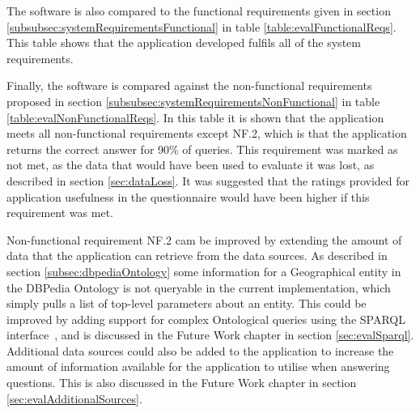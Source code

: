 \documentclass[authoryearcitations]{UoYCSproject}
\begin{document}
The software is also compared to the functional requirements given in section \ref{subsubsec:systemRequirementsFunctional} in table \ref{table:evalFunctionalReqs}. This table shows that the application developed fulfils all of the system requirements.

Finally, the software is compared against the non-functional requirements proposed in section \ref{subsubsec:systemRequirementsNonFunctional} in table \ref{table:evalNonFunctionalReqs}. In this table it is shown that the application meets all non-functional requirements except NF.2, which is that the application returns the correct answer for 90\% of queries. This requirement was marked as not met, as the data that would have been used to evaluate it was lost, as described in section \ref{sec:dataLoss}. It was suggested that the ratings provided for application usefulness in the questionnaire would have been higher if this requirement was met.

Non-functional requirement NF.2 cam be improved by extending the amount of data that the application can retrieve from the data sources. As described in section \ref{subsec:dbpediaOntology} some information for a Geographical entity in the DBPedia Ontology is not queryable in the current implementation, which simply pulls a list of top-level parameters about an entity. This could be improved by adding support for complex Ontological queries using the SPARQL interface~\cite{dbPediaSparql}, and is discussed in the Future Work chapter in section \ref{sec:evalSparql}. Additional data sources could also be added to the application to increase the amount of information available for the application to utilise when answering questions. This is also discussed in the Future Work chapter in section \ref{sec:evalAdditionalSources}.
\end{document}
